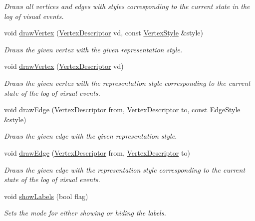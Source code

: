\begin{DoxyCompactItemize}
\begin{DoxyCompactList}\small\item\em Draws all vertices and edges with styles corresponding to the current state in the log of visual events. \end{DoxyCompactList}\item 
void \hyperlink{structDrawer_a5046a31e175475ac536ce5e43f0157ae}{draw\+Vertex} (\hyperlink{structDrawer_a5bccdf5b5e846fb1a958dca6b5f0a1f6}{Vertex\+Descriptor} vd, const \hyperlink{structVertexStyle}{Vertex\+Style} \&style)
\begin{DoxyCompactList}\small\item\em Draws the given vertex with the given representation style. \end{DoxyCompactList}\item 
void \hyperlink{structDrawer_a0efc5d5a322925c227e0f40819b68a7e}{draw\+Vertex} (\hyperlink{structDrawer_a5bccdf5b5e846fb1a958dca6b5f0a1f6}{Vertex\+Descriptor} vd)
\begin{DoxyCompactList}\small\item\em Draws the given vertex with the representation style corresponding to the current state of the log of visual events. \end{DoxyCompactList}\item 
void \hyperlink{structDrawer_ae5037b3b5d28d05ffcdcfafc7f56ae5e}{draw\+Edge} (\hyperlink{structDrawer_a5bccdf5b5e846fb1a958dca6b5f0a1f6}{Vertex\+Descriptor} from, \hyperlink{structDrawer_a5bccdf5b5e846fb1a958dca6b5f0a1f6}{Vertex\+Descriptor} to, const \hyperlink{structEdgeStyle}{Edge\+Style} \&style)
\begin{DoxyCompactList}\small\item\em Draws the given edge with the given representation style. \end{DoxyCompactList}\item 
void \hyperlink{structDrawer_af59cf78a0b46e0ef021e72bb09964d3a}{draw\+Edge} (\hyperlink{structDrawer_a5bccdf5b5e846fb1a958dca6b5f0a1f6}{Vertex\+Descriptor} from, \hyperlink{structDrawer_a5bccdf5b5e846fb1a958dca6b5f0a1f6}{Vertex\+Descriptor} to)
\begin{DoxyCompactList}\small\item\em Draws the given edge with the representation style corresponding to the current state of the log of visual events. \end{DoxyCompactList}\item 
void \hyperlink{structDrawer_ab5afbdc9fa1e7d42b3cfb8af35580c34}{show\+Labels} (bool flag)
\begin{DoxyCompactList}\small\item\em Sets the mode for either showing or hiding the labels. \end{DoxyCompactList}\end{DoxyCompactItemize}
